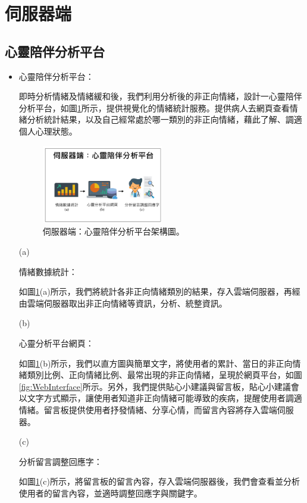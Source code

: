 \documentclass[12pt]{scrreprt}
\begin{document}
\section{伺服器端}
\subsection{心靈陪伴分析平台}
\begin{itemize}
\item{\begin{bfseries}{心靈陪伴分析平台：}\end{bfseries}}即時分析情緒及情緒緩和後，我們利用分析後的非正向情緒，設計一心靈陪伴分析平台，如圖\ref{fig:FrameworkThird}所示，提供視覺化的情緒統計服務。提供病人去網頁查看情緒分析統計結果，以及自己經常處於哪一類別的非正向情緒，藉此了解、調適個人心理狀態。

\vspace{-0.3cm}
\begin{figure}[!h]
\begin{center}
\includegraphics[width=0.5\textwidth]{./figs/FrameworkThird.pdf}
\end{center}
\vspace{-0.5cm}
\caption{伺服器端：心靈陪伴分析平台架構圖。}
\label{fig:FrameworkThird}
\end{figure}
\end{itemize}


\newpage
\begin{itemize}
\item[(a)]{\begin{bfseries}{情緒數據統計：}\end{bfseries}}如圖\ref{fig:FrameworkThird}(a)所示，我們將統計各非正向情緒類別的結果，存入雲端伺服器，再經由雲端伺服器取出非正向情緒等資訊，分析、統整資訊。

\item[(b)]{\begin{bfseries}{心靈分析平台網頁：}\end{bfseries}}如圖\ref{fig:FrameworkThird}(b)所示，我們以直方圖與簡單文字，將使用者的累計、當日的非正向情緒類別比例、正向情緒比例、最常出現的非正向情緒，呈現於網頁平台，如圖\ref{fig:WebInterface}所示。另外，我們提供貼心小建議與留言板，貼心小建議會以文字方式顯示，讓使用者知道非正向情緒可能導致的疾病，提醒使用者調適情緒。留言板提供使用者抒發情緒、分享心情，而留言內容將存入雲端伺服器。

\item[(c)]{\begin{bfseries}{分析留言調整回應字：}\end{bfseries}}如圖\ref{fig:FrameworkThird}(c)所示，將留言板的留言內容，存入雲端伺服器後，我們會查看並分析使用者的留言內容，並適時調整回應字與關鍵字。
\end{itemize}
\end{document}
